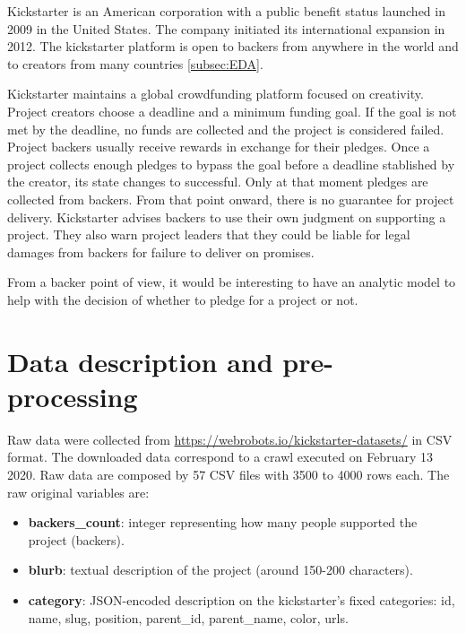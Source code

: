 \documentclass{article}
\begin{document}
{Kickstarter is an American corporation with a public benefit status launched in 2009 in the United States. The company initiated its international expansion in 2012. The kickstarter platform is open to backers from anywhere in the world and to creators from many countries \ref{subsec:EDA}.

Kickstarter maintains a global crowdfunding platform focused on creativity. Project creators choose a deadline and a minimum funding goal. If the goal is not met by the deadline, no funds are collected and the project is considered failed. Project backers usually receive rewards in exchange for their pledges.
Once a project collects enough pledges to bypass the goal before a deadline stablished by the creator, its state changes to successful. Only at that moment pledges are collected from backers. From that point onward, there is no guarantee for project delivery. Kickstarter advises backers to use their own judgment on supporting a project. They also warn project leaders that they could be liable for legal damages from backers for failure to deliver on promises.

From a backer point of view, it would be interesting to have an analytic model to help with the decision of whether to pledge for a project or not.

\section{Data description and pre-processing}
\label{sec:data_desc}

Raw data were collected from \url{https://webrobots.io/kickstarter-datasets/} in CSV format.  The downloaded data correspond to a crawl executed on February 13 2020. Raw data are composed by 57 CSV files with 3500 to 4000 rows each. The raw original variables are:
\begin{itemize}

    \item \textbf{backers\_count}: integer representing how many people supported the project (backers).
    \item \textbf{blurb}: textual description of the project (around 150-200 characters).
    \item \textbf{category}: JSON-encoded description on the kickstarter's fixed categories: id, name, slug, position, parent\_id, parent\_name, color, urls.


\end{itemize}}
\end{document}
